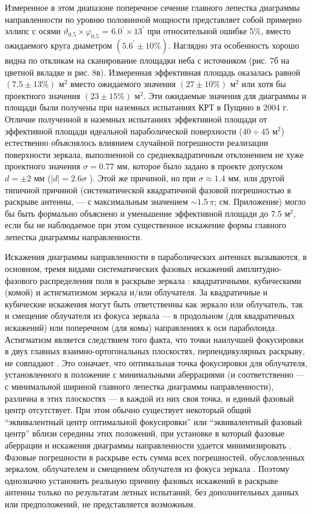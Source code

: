 Измеренное в этом диапазоне поперечное сечение главного лепестка диаграммы
направленности по уровню половинной мощности представляет собой примерно
эллипс с осями
$\vartheta_{0.5}\times \varphi_{0.5}$ = $6.0^\prime\times 13^\prime$
при относительной ошибке 5\%,
вместо ожидаемого круга диаметром $(5.6^\prime \pm 10\%)$.
Наглядно эта особенность хорошо видна по откликам на сканирование площадки
неба с источником (рис. 7б на цветной вкладке и рис. 8в).
Измеренная эффективная площадь оказалась равной $(7.5 \pm 13\%)$ м$^2$
вместо ожидаемого значения $(27 \pm 10\%)$ м$^2$ или хотя бы проектного значения
$(23 \pm 15\%)$ м$^2$.
Эти ожидаемые значения для диаграммы и площади были получены при наземных
испытаниях КРТ в Пущино в 2004 г.
Отличие полученной в наземных испытаниях эффективной площади от
эффективной площади идеальной параболической поверхности ($40 \div 45$ м$^2$)
естественно объяснялось влиянием случайной погрешности реализации поверхности
зеркала, выполненной со среднеквадратичным отклонением не хуже проектного
значения $\sigma = 0.77$ мм, которое было задано в проекте допуском
$d = \pm 2$ мм ($\vert d \vert = 2.6 \sigma$   \cite{}).
Этой же причиной, но при $\sigma \approx 1.4$ мм, или другой типичной причиной
(систематической квадратичной фазовой погрешностью в раскрыве антенны, ---
с максимальным значением $\sim 1.5\,\pi$; см. Приложение) могло бы быть
формально объяснено и уменьшение эффективной площади до 7.5 м$^2$,
если бы не наблюдаемое при этом существенное искажение формы главного лепестка
диаграммы направленности.

Искажения диаграммы направленности в параболических антеннах вызываются,
в основном, тремя видами систематических фазовых искажений амплитудно-фазового
распределения поля в раскрыве зеркала  \cite{}:
квадратичными, кубическими (комой) и астигматизмом зеркала и/или облучателя.
За квадратичные и кубические искажения могут быть ответственны как зеркало или
облучатель, так и смещение облучателя из фокуса зеркала --- в продольном
(для квадратичных искажений) или поперечном (для комы) направлениях к оси
параболоида.
Астигматизм является следствием того факта, что точки наилучшей фокусировки
в двух главных взаимно-ортогональных плоскостях, перпендикулярных раскрыву,
не совпадают  \cite{}.
Это означает, что оптимальная точка фокусировки для облучателя, установленного
в положение с минимальными аберрациями (и соответственно --- с минимальной
шириной главного лепестка диаграммы направленности), различна в этих плоскостях ---
в каждой из них своя точка, и единый фазовый центр отсутствует.
При этом обычно существует некоторый общий ``эквивалентный центр оптимальной
фокусировки'' или ``эквивалентный фазовый центр'' вблизи середины этих положений,
при установке в который фазовые аберрации и искажения диаграммы
направленности удается минимизировать  \cite{}.
Фазовые погрешности в раскрыве есть сумма всех погрешностей,
обусловленных зеркалом, облучателем и смещением облучателя из фокуса зеркала
\cite{}.
Поэтому однозначно установить реальную причину фазовых искажений в раскрыве
антенны только по результатам летных испытаний, без дополнительных данных или
предположений, не представляется возможным.

